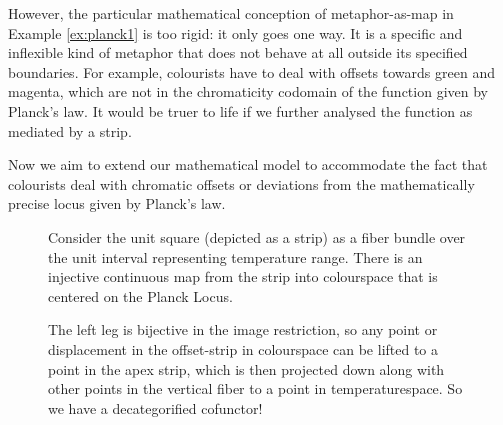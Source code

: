 However, the particular mathematical conception of metaphor-as-map in Example \ref{ex:planck1} is too rigid: it only goes one way. It is a specific and inflexible kind of metaphor that does not behave at all outside its specified boundaries. For example, colourists have to deal with offsets towards green and magenta, which are not in the chromaticity codomain of the function given by Planck's law. It would be truer to life if we further analysed the function as mediated by a strip.

\begin{example}
Now we aim to extend our mathematical model to accommodate the fact that colourists deal with chromatic offsets or deviations from the mathematically precise locus given by Planck's law.
\begin{figure}[h]
\centering
{}
\caption{Consider the unit square (depicted as a strip) as a fiber bundle over the unit interval representing temperature range. There is an injective continuous map from the strip into colourspace that is centered on the Planck Locus.}
\end{figure}
\begin{figure}[h]
\centering
{}
\caption{The left leg is bijective in the image restriction, so any point or displacement in the offset-strip in colourspace can be lifted to a point in the apex strip, which is then projected down along with other points in the vertical fiber to a point in temperaturespace. So we have a decategorified cofunctor!}
\end{figure}
\end{example}

